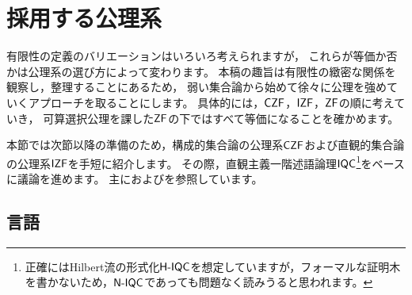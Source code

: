 \section{採用する公理系}
有限性の定義のバリエーションはいろいろ考えられますが，
これらが等価か否かは公理系の選び方によって変わります。
本稿の趣旨は有限性の緻密な関係を観察し，整理することにあるため，
弱い集合論から始めて徐々に公理を強めていくアプローチを取ることにします。
具体的には，\(\CZF\)，\(\IZF\)，\(\ZF\)の順に考えていき，
可算選択公理を課した\(\ZF\)の下ではすべて等価になることを確かめます。

本節では次節以降の準備のため，構成的集合論の公理系\(\CZF\)および直観的集合論の公理系\(\IZF\)を手短に紹介します。
その際，直観主義一階述語論理\(\IQC\)\footnote{正確にはHilbert流の形式化\(\HIQC\)を想定していますが，フォーマルな証明木を書かないため，\(\NIQC\)であっても問題なく読みうると思われます。}をベースに議論を進めます。
主に\cite{sep:set_theory__constructive_an_intuitionistic_zf}および\cite{sep:axiom_of_czf_and_izf}を参照しています。

\subsection{言語}
